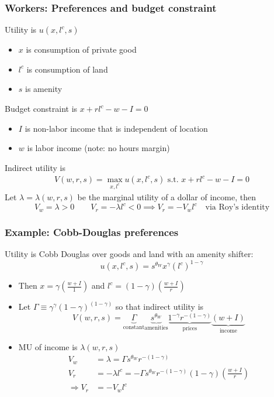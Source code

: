 \documentclass[11pt,notes=hide,aspectratio=169]{beamer}
\begin{document}
\begin{frame}
\frametitle{Workers: Preferences and budget constraint}
Utility is $u(x, l^c, s)$
\begin{itemize}
\item  $x$ is consumption of private good
\item  $l^c$ is consumption of land
\item  $s$ is amenity
\end{itemize}
Budget constraint is $x + rl^c - w - I = 0$
\begin{itemize}
\item $I$ is non-labor income that is independent of location %
\item $w$ is labor income (note: no hours margin)
\end{itemize}
Indirect utility is
\begin{align*}
V(w, r, s)  = \max_{x, l^c} u(x, l^c, s) \text{ s.t. }  x + rl^c - w - I = 0
\end{align*}
Let $\lambda  = \lambda(w, r, s)$ be the marginal utility of a dollar of income, then 
\begin{equation*}
V_w = \lambda >0
\qquad 
V_r = -\lambda l^c <0 
\implies
V_r = - V_w l^c
\quad \text{via Roy's identity}
\end{equation*}
\end{frame}
\begin{frame}
\frametitle{Example: Cobb-Douglas preferences}
Utility is Cobb Douglas over goods and land with an amenity shifter: 
$$u(x, l^c, s)=s^{\theta_W} x^{\gamma} (l^c)^{1-\gamma}$$
\vspace{-7mm}
\begin{itemize}
\item Then $x=\gamma \left(\frac{w + I}{1} \right)$ and $l^c=(1-\gamma)\left(\frac{w + I}{r}\right)$ \medskip
\item Let $\Gamma \equiv \gamma^\gamma (1-\gamma)^{(1-\gamma)}$ so that indirect utility is
\begin{equation*}
V(w, r, s)  = 
\underbrace{\Gamma}_{\text{constant}} 
\underbrace{s^{\theta_W}}_{\text{amenities}} 
\underbrace{1^{-\gamma} r^{-(1-\gamma)}}_{\text{prices}}
\underbrace{(w + I)}_{\text{income}}
\end{equation*}
\item MU of income is $\lambda(w, r, s)$ 
\begin{align*}
V_w &= \lambda = \Gamma s^{\theta_W} r^{-(1-\gamma)}  \\
V_r &= -\lambda l^c =  -\Gamma s^{\theta_W} r^{-(1-\gamma)} (1-\gamma)\left(\frac{w + I}{r}\right) \\
\Rightarrow  V_r &= - V_w l^c 
\end{align*}
\end{itemize}
\end{frame}
\end{document}
